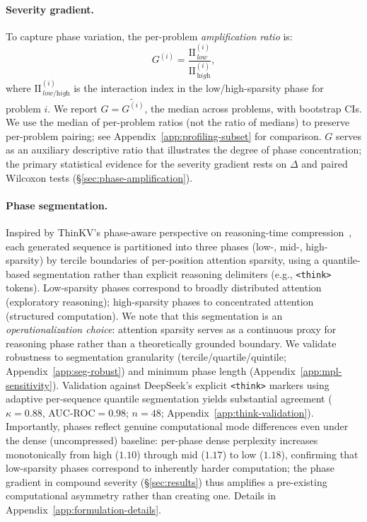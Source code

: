 \paragraph{Severity gradient.}
To capture phase variation, the per-problem \emph{amplification ratio} is:
\begin{equation}
    G^{(i)} = \frac{\mathrm{II}^{(i)}_{\,\textit{low}}}{\mathrm{II}^{(i)}_{\,\textit{high}}},
    \label{eq:gradient}
\end{equation}
where $\mathrm{II}^{(i)}_{\,\textit{low/high}}$ is the interaction index in the low/high-sparsity phase for problem $i$. We report $G = \widetilde{G^{(i)}}$, the median across problems, with bootstrap CIs. We use the median of per-problem ratios (not the ratio of medians) to preserve per-problem pairing; see Appendix~\ref{app:profiling-subset} for comparison. $G$ serves as an auxiliary descriptive ratio that illustrates the degree of phase concentration; the primary statistical evidence for the severity gradient rests on $\Delta$ and paired Wilcoxon tests (\S\ref{sec:phase-amplification}).

\paragraph{Phase segmentation.}
\label{par:phase-segmentation}
Inspired by ThinKV's phase-aware perspective on reasoning-time compression~\cite{thinkv-iclr2026}, each generated sequence is partitioned into three phases (low-, mid-, high-sparsity) by tercile boundaries of per-position attention sparsity, using a quantile-based segmentation rather than explicit reasoning delimiters (e.g., \texttt{<think>} tokens). Low-sparsity phases correspond to broadly distributed attention (exploratory reasoning); high-sparsity phases to concentrated attention (structured computation). We note that this segmentation is an \emph{operationalization choice}: attention sparsity serves as a continuous proxy for reasoning phase rather than a theoretically grounded boundary. We validate robustness to segmentation granularity (tercile/quartile/quintile; Appendix~\ref{app:seg-robust}) and minimum phase length (Appendix~\ref{app:mpl-sensitivity}). Validation against DeepSeek's explicit \texttt{<think>} markers using adaptive per-sequence quantile segmentation yields substantial agreement ($\kappa{=}0.88$, AUC-ROC${=}0.98$; $n{=}48$; Appendix~\ref{app:think-validation}). Importantly, phases reflect genuine computational mode differences even under the dense (uncompressed) baseline: per-phase dense perplexity increases monotonically from high ($1.10$) through mid ($1.17$) to low ($1.18$), confirming that low-sparsity phases correspond to inherently harder computation; the phase gradient in compound severity (\S\ref{sec:results}) thus amplifies a pre-existing computational asymmetry rather than creating one. Details in Appendix~\ref{app:formulation-details}.
